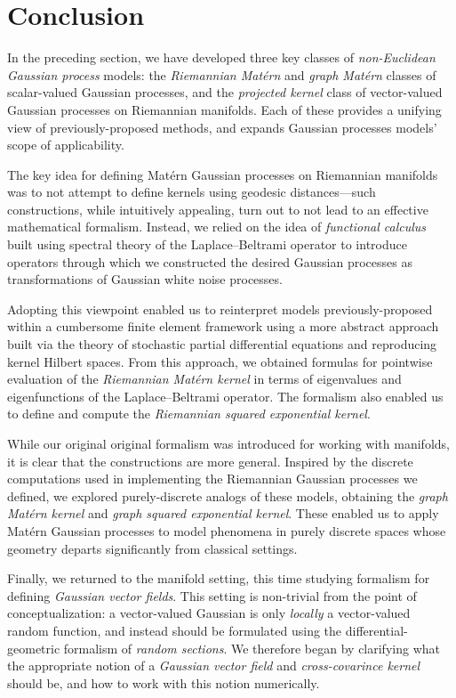 \documentclass[11pt]{book}
\begin{document}
\section{Conclusion}

In the preceding section, we have developed three key classes of \emph{non-Euclidean Gaussian process} models: the \emph{Riemannian Matérn} and \emph{graph Matérn} classes of scalar-valued Gaussian processes, and the \emph{projected kernel} class of vector-valued Gaussian processes on Riemannian manifolds.
Each of these provides a unifying view of previously-proposed methods, and expands Gaussian processes models' scope of applicability.

The key idea for defining Matérn Gaussian processes on Riemannian manifolds was to not attempt to define kernels using geodesic distances---such constructions, while intuitively appealing, turn out to not lead to an effective mathematical formalism.
Instead, we relied on the idea of \emph{functional calculus} built using spectral theory of the Laplace--Beltrami operator to introduce operators through which we constructed the desired Gaussian processes as transformations of Gaussian white noise processes.

Adopting this viewpoint enabled us to reinterpret models previously-proposed within a cumbersome finite element framework using a more abstract approach built via the theory of stochastic partial differential equations and reproducing kernel Hilbert spaces.
From this approach, we obtained formulas for pointwise evaluation of the \emph{Riemannian Matérn kernel} in terms of eigenvalues and eigenfunctions of the Laplace--Beltrami operator.
The formalism also enabled us to define and compute the \emph{Riemannian squared exponential kernel}.

While our original original formalism was introduced for working with manifolds, it is clear that the constructions are more general.
Inspired by the discrete computations used in implementing the Riemannian Gaussian processes we defined, we explored purely-discrete analogs of these models, obtaining the \emph{graph Matérn kernel} and \emph{graph squared exponential kernel}.
These enabled us to apply Matérn Gaussian processes to model phenomena in purely discrete spaces whose geometry departs significantly from classical settings.

Finally, we returned to the manifold setting, this time studying formalism for defining \emph{Gaussian vector fields}.
This setting is non-trivial from the point of conceptualization: a vector-valued Gaussian is only \emph{locally} a vector-valued random function, and instead should be formulated using the differential-geometric formalism of \emph{random sections}.
We therefore began by clarifying what the appropriate notion of a \emph{Gaussian vector field}  and \emph{cross-covarince kernel} should be, and how to work with this notion numerically.
\end{document}
